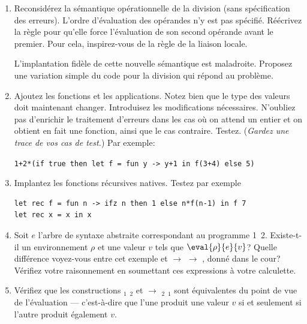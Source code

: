 
\begin{enumerate}

  \item \label{q1} Reconsidérez la sémantique opérationnelle
  de la division (sans spécification des erreurs). L'ordre
  d'évaluation des opérandes n'y est pas spécifié. Réécrivez la
  règle pour qu'elle force l'évaluation de son second opérande
  avant le premier. Pour cela, inspirez-vous de la règle
  de la liaison locale.

  L'implantation fidèle de cette nouvelle sémantique est
  maladroite. Proposez une variation simple du code pour la division
  qui répond au problème.

  \item \label{q2} Ajoutez les fonctions et les
  applications. Notez bien que le type des valeurs doit maintenant
  changer. Introduisez les modifications nécessaires. N'oubliez pas
  d'enrichir le traitement d'erreurs dans les cas où on attend un
  entier et on obtient en fait une fonction, ainsi que le cas
  contraire. Testez. (\emph{Gardez une trace de vos cas de test.}) Par
  exemple:
  {\small
  \begin{center}
  \texttt{1+2*(if true then let f = fun y -> y+1 in f(3+4) else 5)}
  \end{center}
  }

  \item \label{q3} Implantez les fonctions récursives
  natives. Testez par exemple
  {\small
   \begin{verbatim}
let rec f = fun n -> ifz n then 1 else n*f(n-1) in f 7
let rec x = x in x
   \end{verbatim}
  }

  \vspace*{-10pt}

  \item \label{q4} Soit $e$ l'arbre de syntaxe abstraite
  correspondant au programme \num{1}~\num{2}. Existe-t-il un
  environnement $\rho$ et une valeur $v$ tels que $\eval{\rho}{e}{v}$?
  Quelle différence voyez-vous entre cet exemple et \lpar{}
   $\rightarrow$  \rpar{} \lpar{} 
  $\rightarrow$  \rpar, donné dans le cour?  Vérifiez
  votre raisonnement en soumettant ces expressions à votre calculette.

  \item \label{q5} Vérifiez que les constructions 
   \equal{} $_1$  $_2$ et \lpar{}
   $\rightarrow$ $_2$\rpar{} $_1$ sont équivalentes
  du point de vue de l'évaluation --- c'est-à-dire que l'une produit
  une valeur $v$ si et seulement si l'autre produit également $v$.


\end{enumerate}
